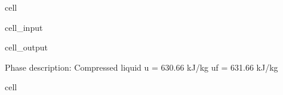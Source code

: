 \documentclass[letterpaper,10pt,english]{jupyterBook}
\begin{document}
\begin{sphinxuseclass}{cell}
\begin{sphinxVerbatimInput}
\begin{sphinxuseclass}{cell_input}
\end{sphinxuseclass}\end{sphinxVerbatimInput}
\begin{sphinxVerbatimOutput}

\begin{sphinxuseclass}{cell_output}
\begin{sphinxVerbatim}[commandchars=\\\{\}]
Phase description: Compressed liquid
u = 630.66 kJ/kg
uf  = 631.66 kJ/kg
\end{sphinxVerbatim}

\end{sphinxuseclass}\end{sphinxVerbatimOutput}

\end{sphinxuseclass}
\begin{sphinxuseclass}{cell}\begin{sphinxVerbatimInput}


\end{sphinxVerbatimInput}
\end{sphinxuseclass}
\end{document}

